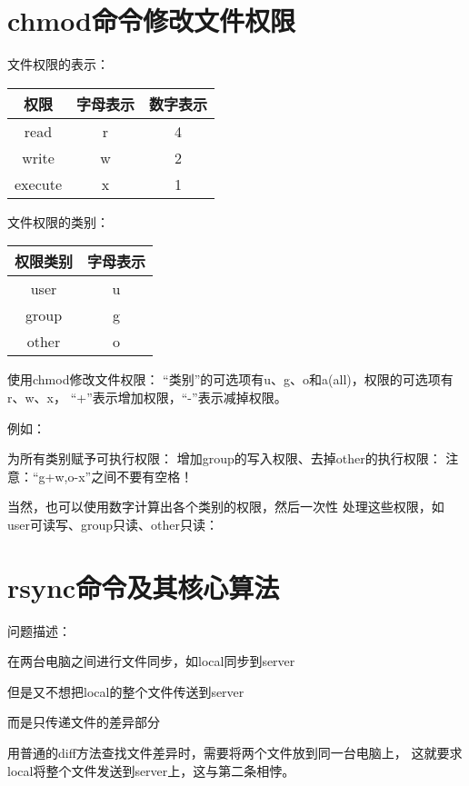 ﻿\documentclass[a4paper,11pt]{article}
\begin{document}
  \section[chmod命令修改文件权限]{chmod命令修改文件权限}
  文件权限的表示：\par
  \begin{center}
  \begin{tabular}{|c|c|c|}
    \hline
    权限 & 字母表示 & 数字表示 \\\hline
    read & r & 4 \\\hline
    write & w & 2 \\\hline
    execute & x & 1 \\\hline
  \end{tabular}
  \end{center}

  文件权限的类别：\par
  \begin{center}
  \begin{tabular}{|c|c|}
    \hline
    权限类别 & 字母表示 \\\hline
    user & u \\\hline
    group & g \\\hline
    other & o \\\hline
  \end{tabular}
  \end{center}

  使用chmod修改文件权限：
  “类别”的可选项有u、g、o和a(all)，权限的可选项有r、w、x，
  “+”表示增加权限，“-”表示减掉权限。

  例如：\par
  为所有类别赋予可执行权限：
  增加group的写入权限、去掉other的执行权限：
  注意：“g+w,o-x”之间不要有空格！

  当然，也可以使用数字计算出各个类别的权限，然后一次性
  处理这些权限，如user可读写、group只读、other只读：


  \section[rsync命令及其核心算法]{rsync命令及其核心算法}
  问题描述：
  \begin{coloredenumerate}
    \item 在两台电脑之间进行文件同步，如local同步到server
    \item 但是又不想把local的整个文件传送到server
    \item 而是只传递文件的差异部分
  \end{coloredenumerate}
  用普通的diff方法查找文件差异时，需要将两个文件放到同一台电脑上，
  这就要求local将整个文件发送到server上，这与第二条相悖。
\end{document}
